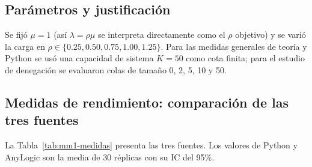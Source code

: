 \documentclass[11pt,a4paper]{article}
\begin{document}
\subsection{Parámetros y justificación}

Se fijó $\mu = 1$ (así $\lambda = \rho\mu$ se interpreta directamente como
el $\rho$ objetivo) y se varió la carga en $\rho \in \{0.25, 0.50, 0.75,
1.00, 1.25\}$. Para las medidas generales de teoría y Python se usó una
capacidad de sistema $K=50$ como cota finita; para el estudio de denegación
se evaluaron colas de tamaño 0, 2, 5, 10 y 50.

\subsection{Medidas de rendimiento: comparación de las tres fuentes}

La Tabla~\ref{tab:mm1-medidas} presenta las tres fuentes. Los valores de
Python y AnyLogic son la media de 30 réplicas con su IC del 95\%.
\end{document}
